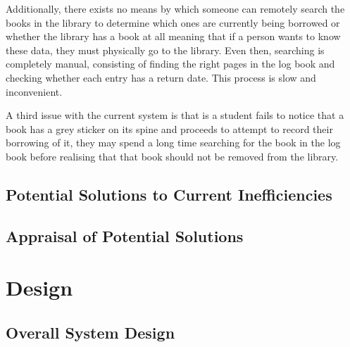 \documentclass[draft]{book}
\begin{document}
Additionally, there exists no means by which someone can remotely search the
books in the library to determine which ones are currently being borrowed or
whether the library has a book at all meaning that if a person wants to know
these data, they must physically go to the library. Even then, searching is
completely manual, consisting of finding the right pages in the log book and
checking whether each entry has a return date. This process is slow and
inconvenient.

A third issue with the current system is that is a student fails to notice that
a book has a grey sticker on its spine and proceeds to attempt to record their
borrowing of it, they may spend a long time searching for the book in the log
book before realising that that book should not be removed from the library. 

\section{Potential Solutions to Current Inefficiencies}

\section{Appraisal of Potential Solutions}


\chapter{Design}

\section{Overall System Design}
\end{document}
